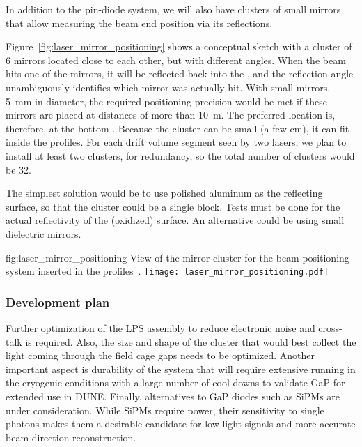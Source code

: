 In addition to the pin-diode system, we will also have clusters of small mirrors that allow measuring the beam end position via its reflections.

Figure~\ref{fig:laser_mirror_positioning} shows a conceptual sketch with a cluster of 6 mirrors located close to each other, but with different angles. When the beam hits one of the mirrors, it will be reflected back into the , and the reflection angle unambiguously identifies which mirror was actually hit. With small mirrors, \SI{5}{\milli\m} in diameter, the required positioning precision would be met if these mirrors are placed at distances of more than \SI{10}{\m}. The preferred location is, therefore, at the bottom . Because the cluster can be small (a few cm), it can fit inside the  profiles. For each drift volume segment seen by two lasers, we plan to install at least two clusters, for redundancy, so the total number of clusters would be \num{32}. 

The simplest solution would be to use polished aluminum as the reflecting surface, so that the cluster could be a single block. Tests must be done for the actual reflectivity of the (oxidized) surface. An alternative could be using small dielectric mirrors.

\begin{dunefigure}{fig:laser_mirror_positioning}
{View of the mirror cluster for the beam positioning system inserted in the  profiles~\cite{bib:yu2019a}.}
\texttt{[image: laser\_mirror\_positioning.pdf]}
\end{dunefigure}


\subsubsection{Development plan}
 Further optimization of the LPS assembly to reduce electronic noise and cross-talk is required. Also, the size and shape of the cluster that would best collect the light coming through the field cage gaps needs to be optimized.  Another important aspect is durability of the system that will require extensive running in the cryogenic conditions with  a large number of cool-downs to validate GaP for extended use in DUNE. Finally, alternatives to GaP diodes such as SiPMs are under consideration. While SiPMs require power, their sensitivity to single photons makes them a desirable candidate for low light signals and more accurate beam direction reconstruction. 
















